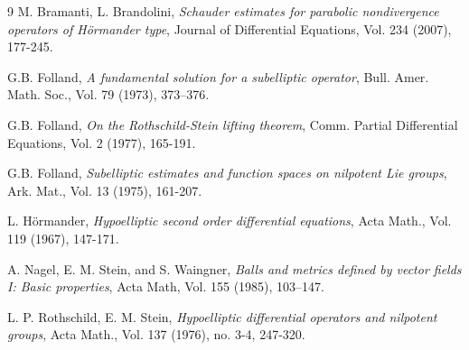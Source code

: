 \documentclass{article}
\numberwithin{equation}{section}
\begin{document}
\begin{thebibliography}{9}
M. Bramanti, L. Brandolini, \emph{Schauder estimates for parabolic nondivergence
operators of Hörmander type}, Journal of Differential Equations, Vol. 234 (2007), 177-245.

 G.B. Folland, \emph{A fundamental solution for a subelliptic operator}, Bull. Amer. Math. Soc., Vol. 79 (1973), 373–376.

 G.B. Folland, \emph{On the Rothschild-Stein lifting theorem}, Comm. Partial Differential Equations, Vol. 2 (1977), 165-191.

 G.B. Folland, \emph{Subelliptic estimates and function spaces on nilpotent Lie
 groups}, Ark. Mat., Vol. 13 (1975), 161-207.

 L. Hörmander, \emph{Hypoelliptic second order differential equations}, Acta Math., Vol. 119 (1967), 147-171.

  A. Nagel, E. M. Stein, and S. Waingner, \emph{Balls and metrics defined by vector fields I: Basic properties}, Acta Math, Vol. 155 (1985), 103–147.

  L. P. Rothschild, E. M. Stein, \emph{Hypoelliptic differential operators and
 nilpotent groups}, Acta Math., Vol. 137 (1976), no. 3-4, 247-320.
    
\end{thebibliography}
\end{document}

